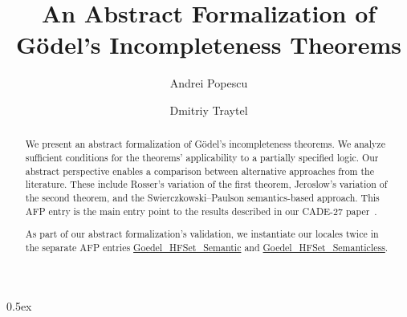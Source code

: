 \documentclass[10pt,a4paper]{report}
\begin{document}
\title{An Abstract Formalization of G\"odel's Incompleteness Theorems}
\author{Andrei Popescu \and Dmitriy Traytel}

\maketitle

\begin{abstract} We present an abstract formalization of G\"odel's incompleteness theorems.
We analyze sufficient conditions for the theorems' applicability to a partially specified logic.
Our abstract perspective enables a comparison between alternative approaches from the literature.
These include Rosser's variation of the first theorem, Jeroslow's variation of the second theorem,
and the Swierczkowski–Paulson semantics-based approach. This AFP entry is the main entry point to the results
described in our CADE-27 paper~\cite{DBLP:conf/cade/0001T19}.

As part of our abstract formalization's validation, we instantiate our locales twice in the separate
AFP entries \href{https://www.isa-afp.org/entries/Goedel_HFSet_Semantic.html}{Goedel\_HFSet\_Semantic} and
\href{https://www.isa-afp.org/entries/Goedel_HFSet_Semanticless.html}{Goedel\_HFSet\_Semanticless}.
\end{abstract}

\tableofcontents

\parindent 0pt\parskip 0.5ex





\end{document}
